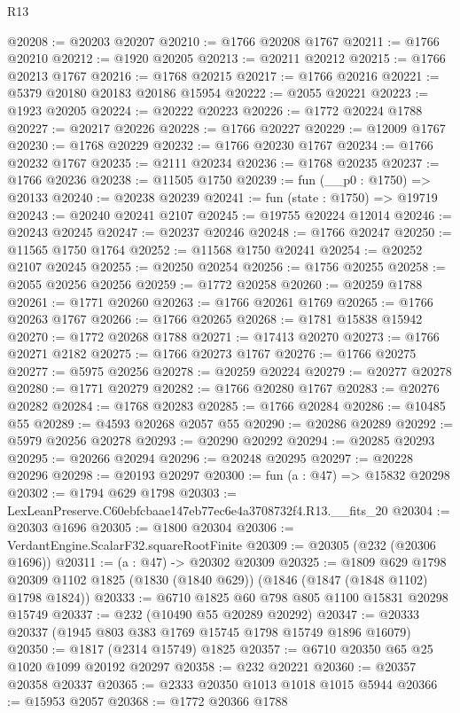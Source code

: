 \begin{lexlean}{R13}
\begin{coremodule}
@20208 := @20203 @20207
@20210 := @1766 @20208 @1767
@20211 := @1766 @20210
@20212 := @1920 @20205
@20213 := @20211 @20212
@20215 := @1766 @20213 @1767
@20216 := @1768 @20215
@20217 := @1766 @20216
@20221 := @5379 @20180 @20183 @20186 @15954
@20222 := @2055 @20221
@20223 := @1923 @20205
@20224 := @20222 @20223
@20226 := @1772 @20224 @1788
@20227 := @20217 @20226
@20228 := @1766 @20227
@20229 := @12009 @1767
@20230 := @1768 @20229
@20232 := @1766 @20230 @1767
@20234 := @1766 @20232 @1767
@20235 := @2111 @20234
@20236 := @1768 @20235
@20237 := @1766 @20236
@20238 := @11505 @1750
@20239 := fun (__p0 : @1750) => @20133
@20240 := @20238 @20239
@20241 := fun (state : @1750) => @19719
@20243 := @20240 @20241 @2107
@20245 := @19755 @20224 @12014
@20246 := @20243 @20245
@20247 := @20237 @20246
@20248 := @1766 @20247
@20250 := @11565 @1750 @1764
@20252 := @11568 @1750 @20241
@20254 := @20252 @2107 @20245
@20255 := @20250 @20254
@20256 := @1756 @20255
@20258 := @2055 @20256 @20256
@20259 := @1772 @20258
@20260 := @20259 @1788
@20261 := @1771 @20260
@20263 := @1766 @20261 @1769
@20265 := @1766 @20263 @1767
@20266 := @1766 @20265
@20268 := @1781 @15838 @15942
@20270 := @1772 @20268 @1788
@20271 := @17413 @20270
@20273 := @1766 @20271 @2182
@20275 := @1766 @20273 @1767
@20276 := @1766 @20275
@20277 := @5975 @20256
@20278 := @20259 @20224
@20279 := @20277 @20278
@20280 := @1771 @20279
@20282 := @1766 @20280 @1767
@20283 := @20276 @20282
@20284 := @1768 @20283
@20285 := @1766 @20284
@20286 := @10485 @55
@20289 := @4593 @20268 @2057 @55
@20290 := @20286 @20289
@20292 := @5979 @20256 @20278
@20293 := @20290 @20292
@20294 := @20285 @20293
@20295 := @20266 @20294
@20296 := @20248 @20295
@20297 := @20228 @20296
@20298 := @20193 @20297
@20300 := fun (a : @47) => @15832 @20298
@20302 := @1794 @629 @1798
@20303 := LexLeanPreserve.C60ebfcbaae147eb77ec6e4a3708732f4.R13.__fits_20
@20304 := @20303 @1696
@20305 := @1800 @20304
@20306 := VerdantEngine.ScalarF32.squareRootFinite
@20309 := @20305 (@232 (@20306 @1696))
@20311 := (a : @47) -> @20302 @20309
@20325 := @1809
    @629
    @1798
    @20309
    @1102
    @1825
    (@1830 (@1840 @629))
    (@1846 (@1847 (@1848 @1102) @1798 @1824))
@20333 := @6710 @1825 @60 @798 @805 @1100 @15831 @20298 @15749
@20337 := @232 (@10490 @55 @20289 @20292)
@20347 := @20333 @20337 (@1945 @803 @383 @1769 @15745 @1798 @15749 @1896 @16079)
@20350 := @1817 (@2314 @15749) @1825
@20357 := @6710 @20350 @65 @25 @1020 @1099 @20192 @20297
@20358 := @232 @20221
@20360 := @20357 @20358 @20337
@20365 := @2333 @20350 @1013 @1018 @1015 @5944
@20366 := @15953 @2057
@20368 := @1772 @20366 @1788

\end{coremodule}
\end{lexlean}
